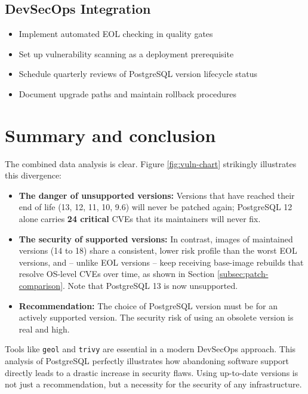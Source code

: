 \documentclass[11pt, a4paper]{article}
\begin{document}
\subsection{DevSecOps Integration}

\begin{itemize}
    \item Implement automated EOL checking in quality gates
    \item Set up vulnerability scanning as a deployment prerequisite
    \item Schedule quarterly reviews of PostgreSQL version lifecycle status
    \item Document upgrade paths and maintain rollback procedures
\end{itemize}

\section{Summary and conclusion}

The combined data analysis is clear. Figure \ref{fig:vuln-chart} strikingly illustrates this divergence:

\begin{itemize}
    \item \textbf{The danger of unsupported versions:} Versions that have reached their end of life (13, 12, 11, 10, 9.6) will never be patched again; PostgreSQL 12 alone carries \textbf{24 critical} CVEs that its maintainers will never fix.
    \item \textbf{The security of supported versions:} In contrast, images of maintained versions (14 to 18) share a consistent, lower risk profile than the worst EOL versions, and -- unlike EOL versions -- keep receiving base-image rebuilds that resolve OS-level CVEs over time, as shown in Section \ref{subsec:patch-comparison}. Note that PostgreSQL 13 is now unsupported.
    \item \textbf{Recommendation:} The choice of PostgreSQL version must be for an actively supported version. The security risk of using an obsolete version is real and high.\\
\end{itemize}

Tools like \texttt{geol} and \texttt{trivy} are essential in a modern DevSecOps approach. This analysis of PostgreSQL perfectly illustrates how abandoning software support directly leads to a drastic increase in security flaws. Using up-to-date versions is not just a recommendation, but a necessity for the security of any infrastructure.
\end{document}
